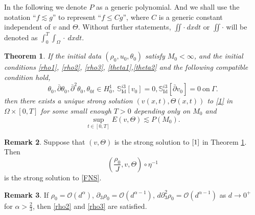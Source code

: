 \documentclass[12pt,a4paper]{amsart}
\numberwithin{equation}{section}
\theoremstyle{plain}
\newtheorem{Thm}{Theorem}[section]
\theoremstyle{definition}
\newtheorem{Rem}[Thm]{Remark}
\newcommand{\bpartial}{\bar{\partial}}
\begin{document}
In the following we denote $P$ as a generic polynomial.
And we shall use the notation ``$f\lesssim g $'' to represent ``$f\leq C g $'', where $C$ is a generic constant independent of $v$ and $\Theta$. Without further statements, $\iint \cdot \ dxdt$ or $\iint \cdot$ will be denoted as $\int_{0}^{T} \int_{\Omega} \cdot \ dxdt$. 

\vspace{0.3cm}
\begin{Thm}\label{mainthm}
	If the initial data $(\rho_0, u_0, \theta_0)$ satisfy $M_0<\infty$, 
	and the initial conditions \eqref{rho1}, \eqref{rho2}, \eqref{rho3}, \eqref{theta1},\eqref{theta2} and the following compatible condition hold,
	\begin{equation}\label{compatible}
	\theta_0,\bpartial \theta_0,\bpartial^2 \theta_0, \theta_{0t} \in H^1_0
	,~ \mathbb{S}^{i3}_{\text{Id}}[v_0]=0, \mathbb{S}^{i3}_{\text{Id}}[\bpartial v_0]=0~\text{on}~\Gamma.
	\end{equation}
	then there exists a unique strong solution $(v(x,t),\Theta(x,t))$ to \eqref{1} in $\Omega\times[0,T]$ for some small enough $T>0$ depending only on $M_0$ and 
	\begin{equation}
	\label{th}
	\sup\limits_{t\in[0,T]} E(v,\Theta) \lesssim P (M_0).
	\end{equation}
\end{Thm}

\begin{Rem}
	Suppose that $(v,\Theta)$ is the strong solution  to $\eqref{1}$ in Theorem \ref{mainthm}. Then 
	$$(\frac{\rho_0}{J},v,\Theta)\circ \eta^{-1}$$
	is the strong solution to \eqref{FNS}.
\end{Rem}


\begin{Rem}
	If $\rho_0=\mathcal{O}(d^{\alpha})$, $\partial_3 \rho_0=\mathcal{O}(d^{\alpha-1})$, $d\partial_3^2 \rho_0=\mathcal{O}(d^{\alpha-1})$ as $d\rightarrow 0^+$ for $\alpha>\frac{2}{3}$, then \eqref{rho2} and \eqref{rho3} are satisfied.
\end{Rem}
\end{document}
